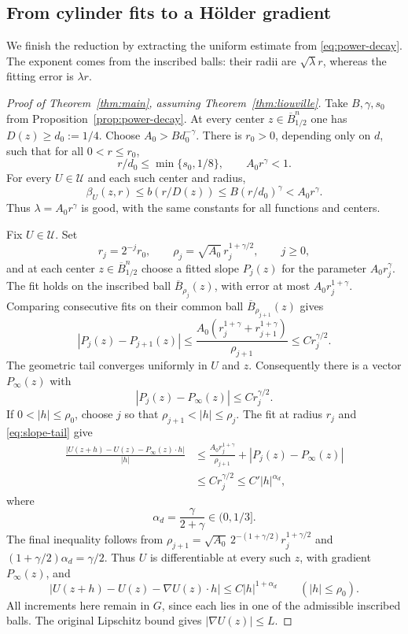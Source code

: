 \documentclass[11pt]{article}
\numberwithin{equation}{section}
\theoremstyle{definition}
\theoremstyle{remark}
\begin{document}
\subsection{From cylinder fits to a H\"older gradient}

We finish the reduction by extracting the uniform estimate from \eqref{eq:power-decay}. The exponent comes from the inscribed balls: their radii are $\sqrt\lambda r$, whereas the fitting error is $\lambda r$.

\begin{proof}[Proof of Theorem~\ref{thm:main}, assuming Theorem~\ref{thm:liouville}]
Take $B,\gamma,s_0$ from Proposition~\ref{prop:power-decay}. At every center $z\in\overline B_{1/2}^n$ one has $D(z)\ge d_0:=1/4$. Choose $A_0>Bd_0^{-\gamma}$. There is $r_0>0$, depending only on $d$, such that for all $0<r\le r_0$,
\[
  r/d_0\le\min\{s_0,1/8\},\qquad A_0r^\gamma<1.
\]
For every $U\in\mathcal U$ and each such center and radius,
\[
  \beta_U(z,r)\le b(r/D(z))
       \le B(r/d_0)^\gamma<A_0r^\gamma.
\]
Thus $\lambda=A_0r^\gamma$ is good, with the same constants for all functions and centers.

Fix $U\in\mathcal U$. Set
\[
  r_j=2^{-j}r_0,\qquad
  \rho_j=\sqrt{A_0}\,r_j^{1+\gamma/2},\qquad j\ge0,
\]
and at each center $z\in\overline B_{1/2}^n$ choose a fitted slope $P_j(z)$ for the parameter $A_0r_j^\gamma$. The fit holds on the inscribed ball $\overline B_{\rho_j}(z)$, with error at most $A_0r_j^{1+\gamma}$. Comparing consecutive fits on their common ball $\overline B_{\rho_{j+1}}(z)$ gives
\[
  |P_j(z)-P_{j+1}(z)|
   \le\frac{A_0(r_j^{1+\gamma}+r_{j+1}^{1+\gamma})}{\rho_{j+1}}
   \le C r_j^{\gamma/2}.
\]
The geometric tail converges uniformly in $U$ and $z$. Consequently there is a vector $P_\infty(z)$ with
\begin{equation}\label{eq:slope-tail}
  |P_j(z)-P_\infty(z)|\le C r_j^{\gamma/2}.
\end{equation}
If $0<|h|\le\rho_0$, choose $j$ so that $\rho_{j+1}<|h|\le\rho_j$. The fit at radius $r_j$ and \eqref{eq:slope-tail} give
\begin{align*}
  \frac{|U(z+h)-U(z)-P_\infty(z)\cdot h|}{|h|}
   &\le\frac{A_0r_j^{1+\gamma}}{\rho_{j+1}}
            +|P_j(z)-P_\infty(z)|\\
   &\le C r_j^{\gamma/2}\le C'|h|^{\alpha_d},
\end{align*}
where
\begin{equation}\label{eq:holder-exponent}
  \alpha_d=\frac{\gamma}{2+\gamma}\in(0,1/3].
\end{equation}
The final inequality follows from
$\rho_{j+1}=\sqrt{A_0}\,2^{-(1+\gamma/2)}r_j^{1+\gamma/2}$ and
$(1+\gamma/2)\alpha_d=\gamma/2$. Thus $U$ is differentiable at every such $z$, with gradient $P_\infty(z)$, and
\begin{equation}\label{eq:uniform-taylor-estimate}
  |U(z+h)-U(z)-\nabla U(z)\cdot h|
       \le C|h|^{1+\alpha_d}\qquad(|h|\le\rho_0).
\end{equation}
All increments here remain in $G$, since each lies in one of the admissible inscribed balls. The original Lipschitz bound gives $|\nabla U(z)|\le L$.


\end{proof}
\end{document}
